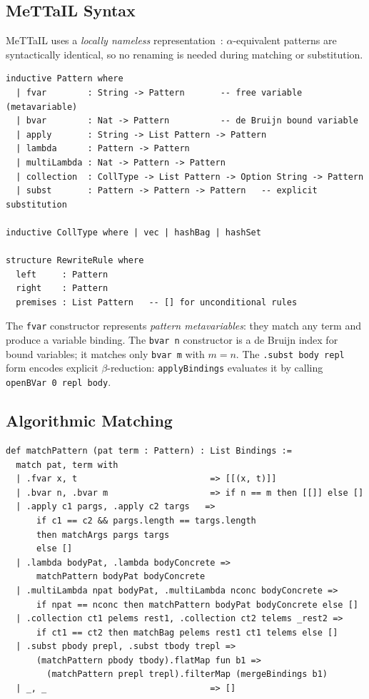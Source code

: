 \documentclass[]{article}
\newcommand{\code}[1]{\texttt{#1}}
\newcommand{\MeTTaIL}{\textup{MeTTaIL}}
\begin{document}
\subsection{\MeTTaIL{} Syntax}

\MeTTaIL{} uses a \emph{locally nameless} representation~\cite{AydemarPOPL2008}:
$\alpha$-equivalent patterns are syntactically identical, so no renaming is needed
during matching or substitution.

\begin{lstlisting}[language=lean]
inductive Pattern where
  | fvar        : String -> Pattern       -- free variable (metavariable)
  | bvar        : Nat -> Pattern          -- de Bruijn bound variable
  | apply       : String -> List Pattern -> Pattern
  | lambda      : Pattern -> Pattern
  | multiLambda : Nat -> Pattern -> Pattern
  | collection  : CollType -> List Pattern -> Option String -> Pattern
  | subst       : Pattern -> Pattern -> Pattern   -- explicit substitution

inductive CollType where | vec | hashBag | hashSet

structure RewriteRule where
  left     : Pattern
  right    : Pattern
  premises : List Pattern   -- [] for unconditional rules
\end{lstlisting}

The \code{fvar} constructor represents \emph{pattern metavariables}: they match any
term and produce a variable binding.  The \code{bvar n} constructor is a de Bruijn
index for bound variables; it matches only \code{bvar m} with $m = n$.
The \code{.subst body repl} form encodes explicit $\beta$-reduction:
\code{applyBindings} evaluates it by calling \code{openBVar 0 repl body}.

\subsection{Algorithmic Matching}

\begin{lstlisting}[language=lean]
def matchPattern (pat term : Pattern) : List Bindings :=
  match pat, term with
  | .fvar x, t                          => [[(x, t)]]
  | .bvar n, .bvar m                    => if n == m then [[]] else []
  | .apply c1 pargs, .apply c2 targs   =>
      if c1 == c2 && pargs.length == targs.length
      then matchArgs pargs targs
      else []
  | .lambda bodyPat, .lambda bodyConcrete =>
      matchPattern bodyPat bodyConcrete
  | .multiLambda npat bodyPat, .multiLambda nconc bodyConcrete =>
      if npat == nconc then matchPattern bodyPat bodyConcrete else []
  | .collection ct1 pelems rest1, .collection ct2 telems _rest2 =>
      if ct1 == ct2 then matchBag pelems rest1 ct1 telems else []
  | .subst pbody prepl, .subst tbody trepl =>
      (matchPattern pbody tbody).flatMap fun b1 =>
        (matchPattern prepl trepl).filterMap (mergeBindings b1)
  | _, _                                => []
\end{lstlisting}
\end{document}
